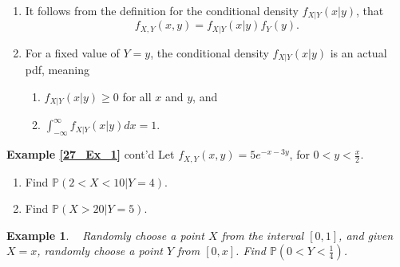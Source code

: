 \documentclass[12pt]{amsart}
\newtheorem{example}[theorem]{Example}
\newcommand\Pbb{\mathbb{P}}
\newcommand\pdfY{f_Y(y)}
\newcommand\pdfXY{f_{X,Y}(x,y)}
\newcommand\pdfXgY{f_{X|Y}(x|y)}
\newcommand\intd{\displaystyle\int}
\begin{document}
{\begin{enumerate}
\item It follows from the definition for the conditional density $\pdfXgY$, that 
$$
\pdfXY = \pdfXgY \pdfY.
$$
\item For a fixed value of $Y=y$, the conditional density $\pdfXgY$ is an actual pdf, meaning
	\begin{enumerate}
	\item $\pdfXgY \geq 0$ for all $x$ and $y$, and
	\item $\intd_{-\infty}^{\infty} \pdfXgY dx =1$.
	\end{enumerate}
\end{enumerate}


\newpage


\textbf{Example \ref{27_Ex_1}} cont'd \newline
Let $\pdfXY = 5 e^{-x-3y}$, for $0 < y < \frac{x}{2}$. 
\begin{enumerate}
\item Find $\Pbb(2<X<10|Y=4)$.

\vspace{18cm}

\item Find $\Pbb(X>20 |Y=5)$.



\end{enumerate}


\newpage


\begin{example}\ %
Randomly choose a point $X$ from the interval $[0,1]$, and %
given $X=x$, randomly choose a point $Y$ from $[0,x]$.\newline
Find $\Pbb(0 < Y < \frac14)$.


\end{example}



}
\end{document}
